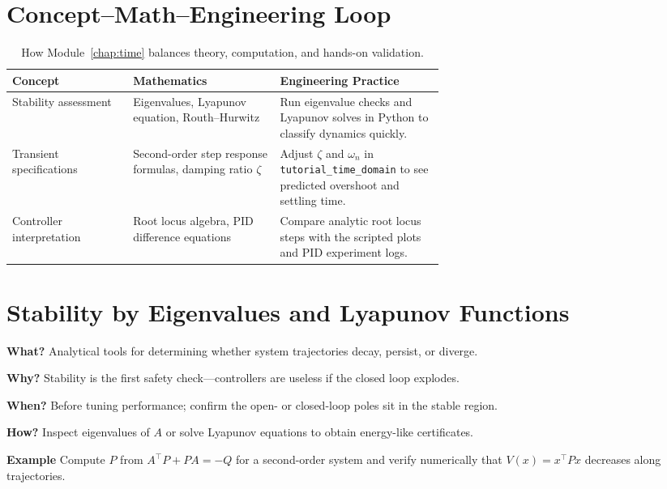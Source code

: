 \section{Concept--Math--Engineering Loop}
\begin{table}[h]
    \centering
    \small
    \renewcommand{\arraystretch}{1.2}
    \begin{tabularx}{\linewidth}{|>{\raggedright\arraybackslash}p{0.28\linewidth}|>{\raggedright\arraybackslash}p{0.34\linewidth}|>{\raggedright\arraybackslash}X|}
        \hline
        \textbf{Concept} & \textbf{Mathematics} & \textbf{Engineering Practice} \\
        \hline
        Stability assessment & Eigenvalues, Lyapunov equation, Routh--Hurwitz & Run eigenvalue checks and Lyapunov solves in Python to classify dynamics quickly. \\
        \hline
        Transient specifications & Second-order step response formulas, damping ratio $\zeta$ & Adjust $\zeta$ and $\omega_n$ in \texttt{tutorial\_time\_domain} to see predicted overshoot and settling time. \\
        \hline
        Controller interpretation & Root locus algebra, PID difference equations & Compare analytic root locus steps with the scripted plots and PID experiment logs. \\
        \hline
    \end{tabularx}
    \caption{How Module~\ref{chap:time} balances theory, computation, and hands-on validation.}
\end{table}

\section{Stability by Eigenvalues and Lyapunov Functions}
\begin{beginnerguide}
    \item[\textbf{What?}] Analytical tools for determining whether system trajectories decay, persist, or diverge.
    \item[\textbf{Why?}] Stability is the first safety check—controllers are useless if the closed loop explodes.
    \item[\textbf{When?}] Before tuning performance; confirm the open- or closed-loop poles sit in the stable region.
    \item[\textbf{How?}] Inspect eigenvalues of $A$ or solve Lyapunov equations to obtain energy-like certificates.
    \item[\textbf{Example}] Compute $P$ from $A^\top P + P A = -Q$ for a second-order system and verify numerically that $V(x)=x^\top P x$ decreases along trajectories.
\end{beginnerguide}
